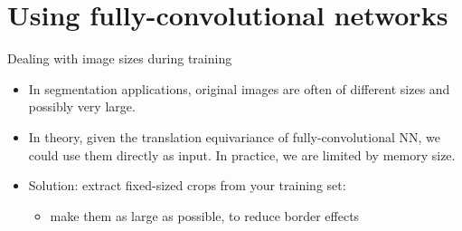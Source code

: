 \documentclass[xcolor=pdftex,dvipsnames,table,mathserif,aspectratio=169]{beamer}
\begin{document}





\section[Using CNNs]{Using fully-convolutional networks}

\begin{frame}{Dealing with image sizes during training}

  \begin{itemize}[<+->]
  \item   In segmentation applications, original images are often of different sizes and possibly very large.
  \item   In theory, given the translation equivariance of fully-convolutional NN, we could use them directly as input. In practice, we are limited by memory size.
  \item   Solution: extract fixed-sized crops from your training set:
    \begin{itemize}
    \item make them as large as possible, to reduce border effects
    \end{itemize}

  \end{itemize}

\end{frame}






\end{document}
